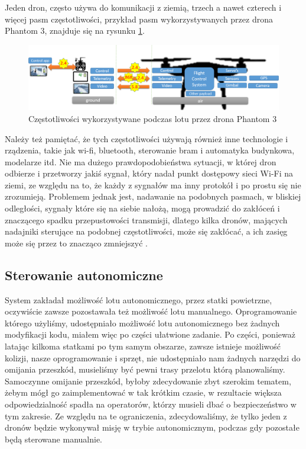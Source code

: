 Jeden dron, często używa do komunikacji z ziemią, trzech a nawet czterech i więcej pasm częstotliwości, przykład pasm wykorzystywanych przez drona Phantom 3, znajduje się na rysunku \ref{fig:phantomczestotliwosci}.

\begin{figure}[!th]
    \centering
    \includegraphics[width=15cm]{zalaczniki/obrazy/phantom_czestotliwosci.png}
	\caption{Częstotliwości wykorzystywane podczas lotu przez drona Phantom 3 \cite{radiointerference}}
    \label{fig:phantomczestotliwosci}
\end{figure}

Należy też pamiętać, że tych częstotliwości używają również inne technologie i rządzenia, takie jak wi-fi, bluetooth, sterowanie bram i automatyka budynkowa, modelarze itd. Nie ma dużego prawdopodobieństwa sytuacji, w której dron odbierze i przetworzy jakiś sygnał, który nadał punkt dostępowy sieci Wi-Fi na ziemi, ze względu na to, że każdy z sygnałów ma inny protokół i po prostu się nie zrozumieją. Problemem jednak jest, nadawanie na podobnych pasmach, w bliskiej odległości, sygnały które się na siebie nałożą, mogą prowadzić do zakłóceń i znaczącego spadku przepustowości transmisji, dlatego kilka dronów, mających nadajniki sterujące na podobnej częstotliwości, może się zakłócać, a ich zasięg może się przez to znacząco zmniejszyć \cite{radiointerference}.

\subsection{Sterowanie autonomiczne}

System zakładał możliwość lotu autonomicznego, przez statki powietrzne, oczywiście zawsze pozostawała też możliwość lotu manualnego. Oprogramowanie którego użyliśmy, udostępniało możliwość lotu autonomicznego bez żadnych modyfikacji kodu, miałem więc po części ułatwione zadanie. Po części, ponieważ latając kilkoma statkami po tym samym obszarze, zawsze istnieje możliwość kolizji, nasze oprogramowanie i sprzęt, nie udostępniało nam żadnych narzędzi do omijania przeszkód, musieliśmy być pewni trasy przelotu którą planowaliśmy. Samoczynne omijanie przeszkód, byłoby zdecydowanie zbyt szerokim tematem, żebym mógł go zaimplementować w tak krótkim czasie, w rezultacie większa odpowiedzialność spadła na operatorów, którzy musieli dbać o bezpieczeństwo w tym zakresie. Ze względu na te ograniczenia, zdecydowaliśmy, że tylko jeden z dronów będzie wykonywał misję w trybie autonomicznym, podczas gdy pozostałe będą sterowane manualnie.

